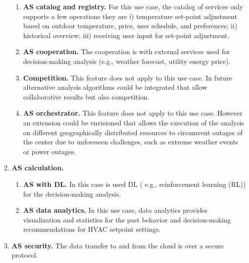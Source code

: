 \begin{enumerate}
\begin{enumerate}
  \item{\bf AS catalog and registry.} For this use case, the catalog of services only supports a few operations they are i) temperature set-point adjustment based on outdoor temperature, price, user schedule, and preferences; ii) historical overview; iii) receiving user input for set-point adjustment.
  \item{\bf AS cooperation.} The cooperation is with external services used for decision-making analysis (e.g., weather forecast, utility energy price).
  \item{\bf Competition.} This feature does not apply to this use case. In future alternative analysis algorithms could be integrated that allow collaborative results but also competition.
  \item{\bf AS orchestrator.} This feature does not apply to this use case. However an extension could be envisioned that allows the execution of the analysis on different geographically distributed resources to circumvent outages of the center due to unforeseen challenges, such as extreme weather events or power outages.
\end{enumerate}


\item{\bf AS calculation.}

\begin{enumerate}
  \item{\bf AS with DL.} In this case is used DL ( e.g., reinforcement learning (RL)) for the decision-making analysis.
  \item{\bf AS data analytics.} In this use case, data analytics provides visualization and statistics for the past behavior and decision-making recommendations for HVAC setpoint settings.
\end{enumerate}

\item{\bf AS security.} The data transfer to and from the cloud is over a secure protocol. 


\end{enumerate}



